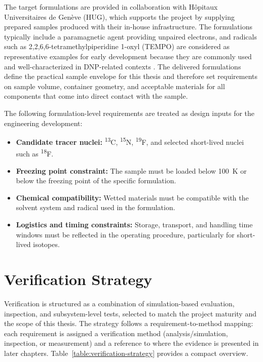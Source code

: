 \documentclass[FM,DP,EN,twoside]{tulthesis}
\begin{document}
The target formulations are provided in collaboration with H\^{o}pitaux Universitaires de Gen\`eve (HUG), which supports the project by supplying prepared samples produced with their in-house infrastructure. The formulations typically include a paramagnetic agent providing unpaired electrons, and radicals such as 2,2,6,6-tetramethylpiperidine 1-oxyl (TEMPO) are considered as representative examples for early development because they are commonly used and well-characterized in DNP-related contexts \cite{tempo_dnp_ref}. The delivered formulations define the practical sample envelope for this thesis and therefore set requirements on sample volume, container geometry, and acceptable materials for all components that come into direct contact with the sample.

The following formulation-level requirements are treated as design inputs for the engineering development:
\begin{itemize}
  \item \textbf{Candidate tracer nuclei:} \textsuperscript{13}C, \textsuperscript{15}N, \textsuperscript{19}F, and selected short-lived nuclei such as \textsuperscript{18}F.
  \item \textbf{Freezing point constraint:} The sample must be loaded below \SI{100}{\kelvin} or below the freezing point of the specific formulation.
  \item \textbf{Chemical compatibility:} Wetted materials must be compatible with the solvent system and radical used in the formulation.
  \item \textbf{Logistics and timing constraints:} Storage, transport, and handling time windows must be reflected in the operating procedure, particularly for short-lived isotopes.
\end{itemize}

\section{Verification Strategy}
\label{sec:verification-strategy}
Verification is structured as a combination of simulation-based evaluation, inspection, and subsystem-level tests, selected to match the project maturity and the scope of this thesis. The strategy follows a requirement-to-method mapping: each requirement is assigned a verification method (analysis/simulation, inspection, or measurement) and a reference to where the evidence is presented in later chapters. Table~\ref{table:verification-strategy} provides a compact overview.
\end{document}
